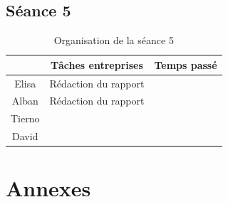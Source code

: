 \documentclass{rapport}
\begin{document}
\subsection{Séance 5} %

\begin{table}[H]
	\centering 
	\begin{tabular}{c|c|c}
		& Tâches entreprises& Temps passé\\ \hline
		Elisa& Rédaction du rapport & \\ \hline
		Alban& Rédaction du rapport & \\ \hline
		Tierno& & \\ \hline
		David& & 
	\end{tabular}
	\caption{Organisation de la séance 5}
\end{table}

\newpage

\section{Annexes}

\lstset{style=mystyle}
\end{document}
